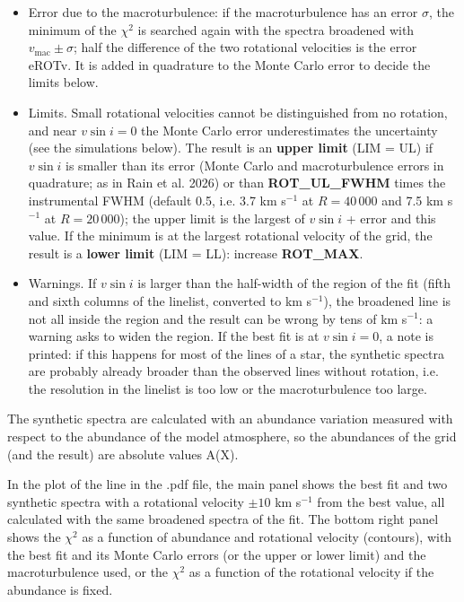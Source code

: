 \documentclass[modern]{aastex701}
\begin{document}
\begin{itemize}
    \item Error due to the macroturbulence: if the macroturbulence has an error $\sigma$, the minimum of the $\chi^2$ is searched again with the spectra broadened with $v_{\mathrm{mac}} \pm \sigma$; half the difference of the two rotational velocities is the error eROTv. It is added in quadrature to the Monte Carlo error to decide the limits below.
    \item Limits. Small rotational velocities cannot be distinguished from no rotation, and near $v \sin i = 0$ the Monte Carlo error underestimates the uncertainty (see the simulations below). The result is an {\bf upper limit} (LIM = UL) if $v \sin i$ is smaller than its error (Monte Carlo and macroturbulence errors in quadrature; as in Rain et al. 2026) or than {\bf ROT\_UL\_FWHM} times the instrumental FWHM (default 0.5, i.e. 3.7 km s$^{-1}$ at $R = 40\,000$ and 7.5 km s$^{-1}$ at $R = 20\,000$); the upper limit is the largest of $v \sin i$ + error and this value. If the minimum is at the largest rotational velocity of the grid, the result is a {\bf lower limit} (LIM = LL): increase {\bf ROT\_MAX}.
    \item Warnings. If $v \sin i$ is larger than the half-width of the region of the fit (fifth and sixth columns of the linelist, converted to km s$^{-1}$), the broadened line is not all inside the region and the result can be wrong by tens of km s$^{-1}$: a warning asks to widen the region. If the best fit is at $v \sin i = 0$, a note is printed: if this happens for most of the lines of a star, the synthetic spectra are probably already broader than the observed lines without rotation, i.e. the resolution in the linelist is too low or the macroturbulence too large.
\end{itemize}
The synthetic spectra are calculated with an abundance variation measured with respect to the abundance of the model atmosphere, so the abundances of the grid (and the result) are absolute values A(X).

In the plot of the line in the .pdf file, the main panel shows the best fit and two synthetic spectra with a rotational velocity $\pm 10$ km s$^{-1}$ from the best value, all calculated with the same broadened spectra of the fit. The bottom right panel shows the $\chi^2$ as a function of abundance and rotational velocity (contours), with the best fit and its Monte Carlo errors (or the upper or lower limit) and the macroturbulence used, or the $\chi^2$ as a function of the rotational velocity if the abundance is fixed.
\end{document}
